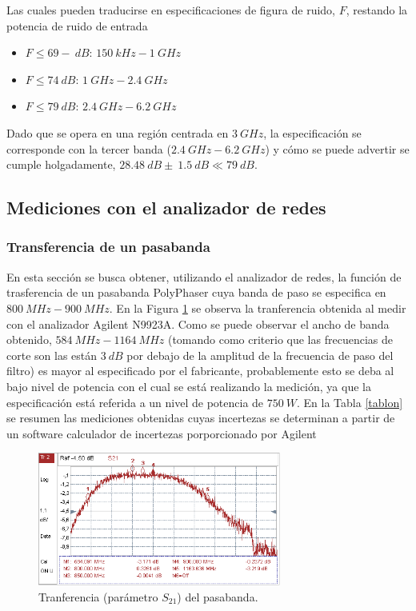 \documentclass[a4paper,10pt]{article}
\begin{document}
		\indent Las cuales pueden traducirse en especificaciones de figura de 
		ruido, $F$, restando la potencia de ruido de entrada
		
		\begin{itemize}
			\item $F\leq69-~dB$: 	$150~kHz-1~GHz$
			\item $F\leq74~dB$:	 $1~GHz-2.4~GHz$
			\item $F\leq79~dB$:	 $2.4~GHz-6.2~GHz$
		\end{itemize}
		
		\indent Dado que se opera en una regi\'on centrada en $3~GHz$, la 
		especificaci\'on se corresponde con la tercer banda ($2.4~GHz-6.2~GHz$) 
		y c\'omo se puede advertir se cumple holgadamente, 
		$28.48~dB\pm~1.5~dB\ll79~dB$.
		
	\subsection{Mediciones con el analizador de redes}
		\subsubsection{Transferencia de un pasabanda}
		\indent En esta secci\'on se busca obtener, utilizando el analizador de 
		redes, la funci\'on de trasferencia de un pasabanda PolyPhaser cuya 
		banda de paso se especifica en  $800~MHz-900~MHz$. En la Figura 
		\ref{transferenciabandpass} se observa la tranferencia obtenida al 
		medir con el analizador Agilent N9923A. Como se puede observar el ancho 
		de banda obtenido, $584~MHz-1164~MHz$ (tomando como criterio que las frecuencias de corte son las est\'an $3~dB$ por debajo de la amplitud de la frecuencia de paso del filtro) es mayor al especificado por el fabricante, 
		probablemente esto se deba al bajo nivel de potencia con el cual se 
		est\'a realizando la medici\'on, ya que la especificaci\'on est\'a 
		referida a un nivel de potencia de $750~W$.
		En la Tabla \ref{tablon} se resumen las mediciones obtenidas cuyas incertezas se determinan a partir de un software calculador de incertezas porporcionado por Agilent
		
		\begin{figure}[!htb]
				\centering
				\includegraphics[width=8cm]
				{Imagenes/transferenciapasabanda.PNG}
				\caption{Tranferencia (par\'ametro $S_{21}$) del pasabanda.}
				\label{transferenciabandpass} 
		\end{figure}
		
\end{document}

